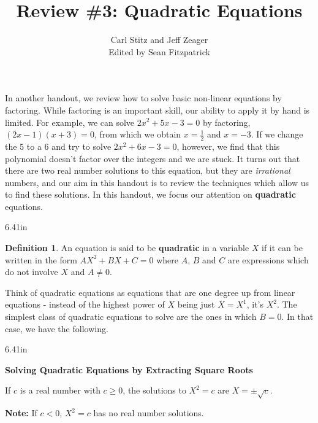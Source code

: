 \documentclass[11pt]{article}
\title{Review \#3: Quadratic Equations}
\author{Carl Stitz and Jeff Zeager\\
Edited by Sean Fitzpatrick}
\theoremstyle{definition}  %
\newtheorem{defn}{\bf Definition}
\newcommand{\bbm}{\begin{boxedminipage}{6.41in}}
\newcommand{\ebm}{\end{boxedminipage}}
\begin{document}
\maketitle


\renewcommand{\headrulewidth}{0pt}
\renewcommand{\headheight}{14pt}
\lhead[\fancyplain{}{\sc\thepage}]%
      {\fancyplain{}{\sc \nouppercase{\rightmark}}}
\rhead[\fancyplain{}{\sc \nouppercase{\leftmark}}]%
      {\fancyplain{}{\sc\thepage}}
\cfoot{}


In another handout, we review how to solve basic non-linear equations by factoring.  While factoring is an important skill, our ability to apply it by hand is limited. For example, we can solve $2x^2+5x-3=0$ by factoring, $(2x-1)(x+3) = 0$, from which we obtain $x = \frac{1}{2}$ and $x = -3$.  If we change the $5$ to a $6$ and try to solve $2x^2 + 6x - 3 = 0$, however, we find that this polynomial doesn't factor over the integers and we are stuck.  It turns out that there are two real number solutions to this equation, but they are \textit{irrational} numbers, and our aim in this handout is to review the techniques which allow us to find these solutions. In this handout, we focus our attention on \textbf{quadratic} equations.

\medskip

\colorbox{ResultColor}{\bbm

\begin{defn}\label{quadeqndefn} An equation is said to be \textbf{quadratic} in a variable $X$ if it can be written in the form $AX^2 + BX + C = 0$ where $A$, $B$ and $C$ are expressions which do not involve $X$ and $A \neq 0$.

\end{defn}

\ebm}

\medskip

Think of quadratic equations as equations that are one degree up from linear equations - instead of the highest power of $X$ being just $X = X^1$, it's $X^2$.  The simplest class of quadratic equations to solve are the ones in which $B = 0$.  In that case, we have the following.

\medskip

\label{extractingthesquareroot}

\colorbox{ResultColor}{\bbm

\centerline{\textbf{Solving Quadratic Equations by Extracting Square Roots}}
\vspace{.05in}
If $c$ is a real number with $c \geq 0$, the solutions to $X^2 = c$ are $X = \pm \sqrt{c}$.

\vspace{.05in}
\textbf{Note:}  If $c < 0$, $X^2 = c$ has no real number solutions.

\ebm}
\end{document}
